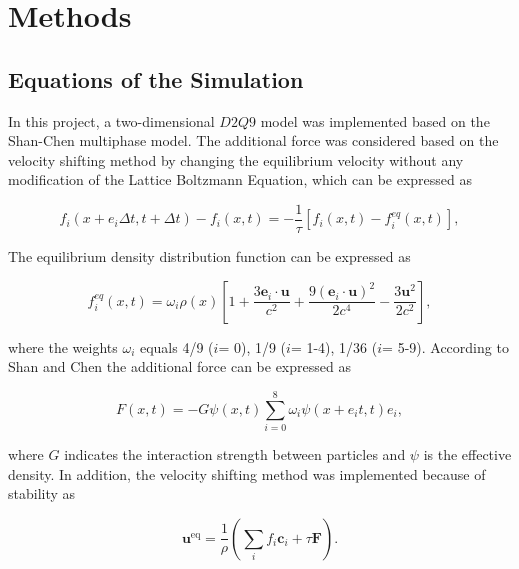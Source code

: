 \documentclass[review]{elsarticle}
\begin{document}
\section{Methods}

\subsection{Equations of the Simulation}
In this project, a two-dimensional $D2Q9$ model was implemented based on the Shan-Chen multiphase model. The additional force was considered based on the velocity shifting method by changing the equilibrium velocity without any modification of the Lattice Boltzmann Equation, which can be expressed as \cite{kruger2017lattice}
\begin{linenomath*}
\begin{equation}
	f_i\left(x+e_i \Delta t, t+\Delta t\right)-f_i(x, t)=-\frac{1}{\tau}\left[f_i(x, t)-f_i^{e q}(x, t)\right],
\end{equation}
\end{linenomath*}
The equilibrium density distribution function can be expressed as \cite{mohamad2011lattice}
\begin{linenomath*}
\begin{equation}
	f_i^{e q}(x, t)=\omega_i \rho(x)\left[1+\frac{3 \boldsymbol{e}_i \cdot \boldsymbol{u}}{c^2}+\frac{9\left(\boldsymbol{e}_i \cdot \boldsymbol{u}\right)^2}{2 c^4}-\frac{3 \boldsymbol{u}^2}{2 c^2}\right],
\end{equation}
\end{linenomath*}
where the weights $\omega_i$ equals 4/9 ($i$= 0), 1/9 ($i$= 1-4), 1/36 ($i$= 5-9). According to Shan and Chen \cite{shan1993lattice} the additional force can be expressed as
\begin{linenomath*}
\begin{equation}
	F(x, t)=-G \psi(x, t) \sum_{i=0}^8 \omega_i \psi\left(x+e_i t, t\right) e_i,
\end{equation}
\end{linenomath*}
where $G$ indicates the interaction strength between particles and $\psi$ is the effective density. In addition, the velocity shifting method was implemented because of stability \cite{kruger2017lattice} as
\begin{linenomath*}
\begin{equation}
	\boldsymbol{u}^{\mathrm{eq}}=\frac{1}{\rho}\left(\sum_i f_i \boldsymbol{c}_i+\tau \boldsymbol{F}\right).
\end{equation}
\end{linenomath*}
\end{document}
